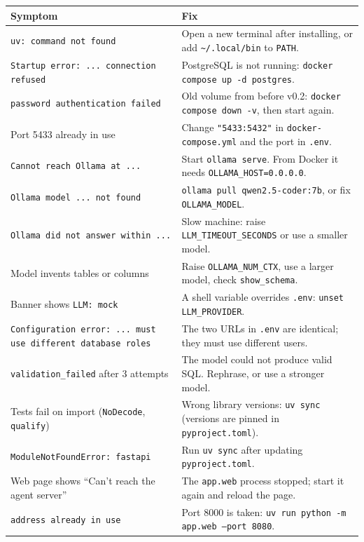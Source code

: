 \documentclass[11pt,a4paper]{article}
\begin{document}
\begin{center}
\begin{tabular}{@{}p{5.8cm}p{8.8cm}@{}}
\toprule
\textbf{Symptom} & \textbf{Fix} \\
\midrule
\texttt{uv: command not found} &
Open a new terminal after installing, or add \texttt{\textasciitilde/.local/bin} to \texttt{PATH}. \\
\texttt{Startup error: ... connection refused} &
PostgreSQL is not running: \texttt{docker compose up -d postgres}. \\
\texttt{password authentication failed} &
Old volume from before v0.2: \texttt{docker compose down -v}, then start again. \\
Port 5433 already in use &
Change \texttt{"5433:5432"} in \texttt{docker-compose.yml} and the port in \texttt{.env}. \\
\texttt{Cannot reach Ollama at ...} &
Start \texttt{ollama serve}. From Docker it needs \texttt{OLLAMA\_HOST=0.0.0.0}. \\
\texttt{Ollama model ... not found} &
\texttt{ollama pull qwen2.5-coder:7b}, or fix \texttt{OLLAMA\_MODEL}. \\
\texttt{Ollama did not answer within ...} &
Slow machine: raise \texttt{LLM\_TIMEOUT\_SECONDS} or use a smaller model. \\
Model invents tables or columns &
Raise \texttt{OLLAMA\_NUM\_CTX}, use a larger model, check \texttt{show\_schema}. \\
Banner shows \texttt{LLM: mock} &
A shell variable overrides \texttt{.env}: \texttt{unset LLM\_PROVIDER}. \\
\texttt{Configuration error: ... must use different database roles} &
The two URLs in \texttt{.env} are identical; they must use different users. \\
\texttt{validation\_failed} after 3 attempts &
The model could not produce valid SQL. Rephrase, or use a stronger model. \\
Tests fail on import (\texttt{NoDecode}, \texttt{qualify}) &
Wrong library versions: \texttt{uv sync} (versions are pinned in \texttt{pyproject.toml}). \\
\texttt{ModuleNotFoundError: fastapi} &
Run \texttt{uv sync} after updating \texttt{pyproject.toml}. \\
Web page shows ``Can't reach the agent server'' &
The \texttt{app.web} process stopped; start it again and reload the page. \\
\texttt{address already in use} &
Port 8000 is taken: \texttt{uv run python -m app.web --port 8080}. \\
\bottomrule
\end{tabular}
\end{center}
\end{document}
